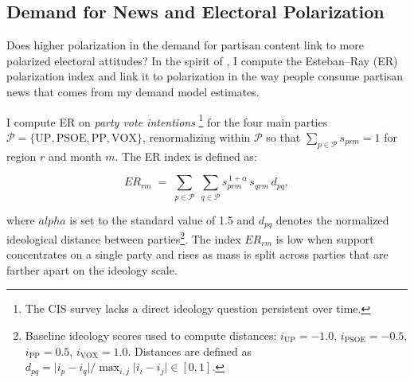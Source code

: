 \documentclass[12pt]{article}
\begin{document}

	\subsection{Demand for News and Electoral Polarization}
	
	
	

Does higher polarization in the demand for partisan content link to more polarized electoral attitudes? In the spirit of \cite{martin2017}, I 
compute the Esteban–Ray (ER) polarization index and link it to polarization in the way people consume partisan news that comes from my demand model estimates. 

I compute ER on \emph{party vote intentions} \footnote{The CIS survey lacks a direct ideology question persistent over time.} for the four main parties $\mathcal{P}=\{\mathrm{UP},\mathrm{PSOE},\mathrm{PP},\mathrm{VOX}\}$, renormalizing within $\mathcal{P}$ so that $\sum_{p\in\mathcal{P}} s_{prm}=1$ for region $r$ and month $m$. The ER index is defined as: 

\begin{equation}
	ER_{rm} \;=\; 
	\displaystyle\sum_{p\in\mathcal{P}} \; \sum_{q\in\mathcal{P}} 
	s_{prm}^{\,1+\alpha}\, s_{qrm}\, d_{pq},
\end{equation}


where $alpha$ is set to the standard value of 1.5 and $d_{pq}$ denotes the normalized ideological distance between parties\footnote{Baseline ideology scores used to compute distances: $i_{\mathrm{UP}}=-1.0$, $i_{\mathrm{PSOE}}=-0.5$, $i_{\mathrm{PP}}=0.5$, $i_{\mathrm{VOX}}=1.0$. Distances are defined as $d_{pq}=\lvert i_p-i_q\rvert/\max_{i,j}\lvert i_i-i_j\rvert \in [0,1]$.}. The index $ER_{rm}$ is low when support concentrates on a single party and rises as mass is split across parties that are farther apart on the ideology scale.
\end{document}
